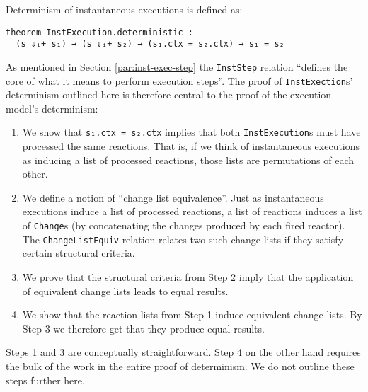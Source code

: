 Determinism of instantaneous executions is defined as:

\begin{lstlisting}
theorem InstExecution.deterministic : 
  (s ⇓ᵢ+ s₁) → (s ⇓ᵢ+ s₂) → (s₁.ctx = s₂.ctx) → s₁ = s₂
\end{lstlisting}

As mentioned in Section \ref{par:inst-exec-step} the \lstinline{InstStep} relation ``defines the core of what it means to perform execution steps''.
The proof of \lstinline{InstExection}s' determinism outlined here is therefore central to the proof of the execution model's determinism:

\begin{enumerate}
  \item We show that \lstinline{s₁.ctx = s₂.ctx} implies that both \lstinline{InstExecution}s must have processed the same reactions.
        That is, if we think of instantaneous executions as inducing a list of processed reactions, those lists are permutations of each other. 
  \item We define a notion of ``change list equivalence''.
        Just as instantaneous executions induce a list of processed reactions, a list of reactions induces a list of \lstinline{Change}s (by concatenating the changes produced by each fired reactor).
        The \lstinline{ChangeListEquiv} relation relates two such change lists if they satisfy certain structural criteria. 
  \item We prove that the structural criteria from Step 2 imply that the application of equivalent change lists leads to equal results.
  \item We show that the reaction lists from Step 1 induce equivalent change lists.
        By Step 3 we therefore get that they produce equal results.
\end{enumerate}

Steps 1 and 3 are conceptually straightforward.
Step 4 on the other hand requires the bulk of the work in the entire proof of determinism.
We do not outline these steps further here.